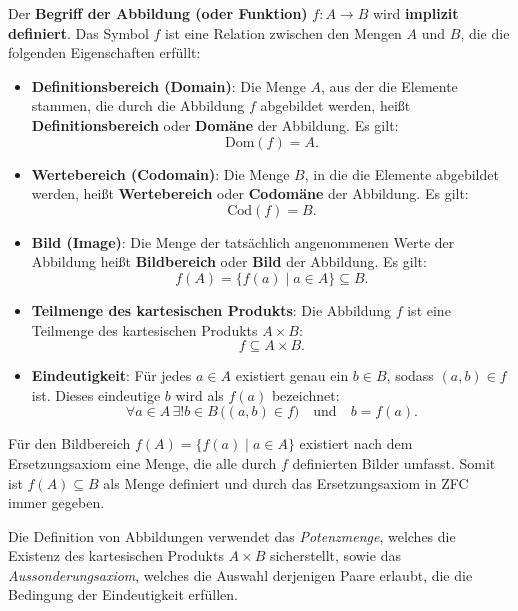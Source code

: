 \documentclass[main.tex]{subfiles}
\begin{document}
\begin{definition}[Abbildung]
    Der \textbf{Begriff der Abbildung (oder Funktion)} \( f: A \to B \) wird \textbf{implizit definiert}. Das Symbol \( f \) ist eine Relation zwischen den Mengen \( A \) und \( B \), die die folgenden Eigenschaften erfüllt:
    
    \begin{itemize}
        \item \textbf{Definitionsbereich (Domain)}: Die Menge \( A \), aus der die Elemente stammen, die durch die Abbildung \( f \) abgebildet werden, heißt \textbf{Definitionsbereich} oder \textbf{Domäne} der Abbildung. Es gilt:
        \[
        \text{Dom}(f) = A.
        \]
        
        \item \textbf{Wertebereich (Codomain)}: Die Menge \( B \), in die die Elemente abgebildet werden, heißt \textbf{Wertebereich} oder \textbf{Codomäne} der Abbildung. Es gilt:
        \[
        \text{Cod}(f) = B.
        \]
        
        \item \textbf{Bild (Image)}: Die Menge der tatsächlich angenommenen Werte der Abbildung heißt \textbf{Bildbereich} oder \textbf{Bild} der Abbildung. Es gilt:
        \[
        f(A) = \{ f(a) \mid a \in A \} \subseteq B.
        \]
        
        \item \textbf{Teilmenge des kartesischen Produkts}: Die Abbildung \( f \) ist eine Teilmenge des kartesischen Produkts \( A \times B \):
        \[
        f \subseteq A \times B.
        \]
        
        \item \textbf{Eindeutigkeit}: Für jedes \( a \in A \) existiert genau ein \( b \in B \), sodass \( (a, b) \in f \) ist. Dieses eindeutige \( b \) wird als \( f(a) \) bezeichnet:
        \[
        \forall a \in A \, \exists! b \in B \, \big( (a, b) \in f \big) \quad \text{und} \quad b = f(a).
        \]
    \end{itemize}
\end{definition}
\begin{remark}
     Für den Bildbereich \( f(A) = \{ f(a) \mid a \in A \} \) existiert nach dem Ersetzungsaxiom eine Menge, die alle durch \( f \) definierten Bilder umfasst. Somit ist \( f(A) \subseteq B \) als Menge definiert und durch das Ersetzungsaxiom in ZFC immer gegeben.
\end{remark}

Die Definition von Abbildungen verwendet das \textit{Potenzmenge}, welches die Existenz des kartesischen Produkts \( A \times B \) sicherstellt, sowie das \textit{Aussonderungsaxiom}, welches die Auswahl derjenigen Paare erlaubt, die die Bedingung der Eindeutigkeit erfüllen.
\end{document}
